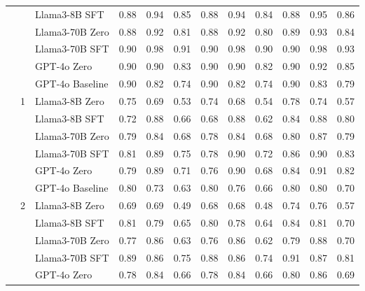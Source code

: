 \begin{longtable}[t]{ll>{}l|rr>{}r|rr>{}r|rrr}
 &  & Llama3-8B SFT & 0.88 & 0.94 & 0.85 & 0.88 & 0.94 & 0.84 & 0.88 & 0.95 & 0.86\\

 &  & Llama3-70B Zero & 0.88 & 0.92 & 0.81 & 0.88 & 0.92 & 0.80 & 0.89 & 0.93 & 0.84\\

 &  & Llama3-70B SFT & 0.90 & 0.98 & 0.91 & 0.90 & 0.98 & 0.90 & 0.90 & 0.98 & 0.93\\

 &  & GPT-4o Zero & 0.90 & 0.90 & 0.83 & 0.90 & 0.90 & 0.82 & 0.90 & 0.92 & 0.85\\

 &  & GPT-4o Baseline & 0.90 & 0.82 & 0.74 & 0.90 & 0.82 & 0.74 & 0.90 & 0.83 & 0.79\\
\cmidrule{2-12}
 & 1 & Llama3-8B Zero & 0.75 & 0.69 & 0.53 & 0.74 & 0.68 & 0.54 & 0.78 & 0.74 & 0.57\\

 &  & Llama3-8B SFT & 0.72 & 0.88 & 0.66 & 0.68 & 0.88 & 0.62 & 0.84 & 0.88 & 0.80\\

 &  & Llama3-70B Zero & 0.79 & 0.84 & 0.68 & 0.78 & 0.84 & 0.68 & 0.80 & 0.87 & 0.79\\

 &  & Llama3-70B SFT & 0.81 & 0.89 & 0.75 & 0.78 & 0.90 & 0.72 & 0.86 & 0.90 & 0.83\\

 &  & GPT-4o Zero & 0.79 & 0.89 & 0.71 & 0.76 & 0.90 & 0.68 & 0.84 & 0.91 & 0.82\\

 &  & GPT-4o Baseline & 0.80 & 0.73 & 0.63 & 0.80 & 0.76 & 0.66 & 0.80 & 0.80 & 0.70\\
\cmidrule{2-12}
 & 2 & Llama3-8B Zero & 0.69 & 0.69 & 0.49 & 0.68 & 0.68 & 0.48 & 0.74 & 0.76 & 0.57\\

 &  & Llama3-8B SFT & 0.81 & 0.79 & 0.65 & 0.80 & 0.78 & 0.64 & 0.84 & 0.81 & 0.70\\

 &  & Llama3-70B Zero & 0.77 & 0.86 & 0.63 & 0.76 & 0.86 & 0.62 & 0.79 & 0.88 & 0.70\\

 &  & Llama3-70B SFT & 0.89 & 0.86 & 0.75 & 0.88 & 0.86 & 0.74 & 0.91 & 0.87 & 0.81\\

 &  & GPT-4o Zero & 0.78 & 0.84 & 0.66 & 0.78 & 0.84 & 0.66 & 0.80 & 0.86 & 0.69\\


\end{longtable}

